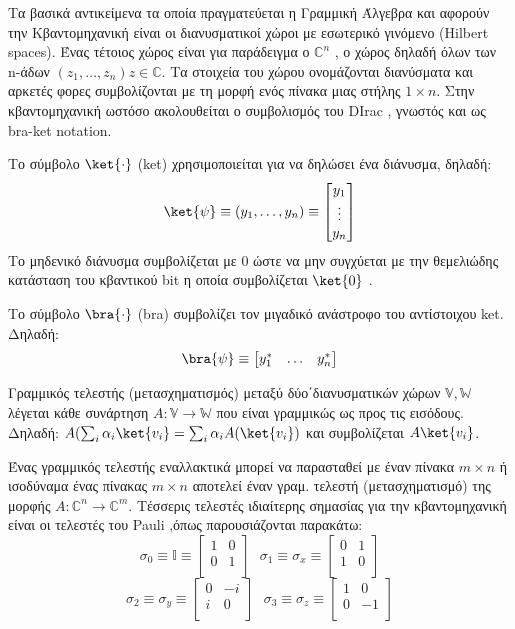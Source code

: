 


Τα βασικά αντικείμενα τα οποία πραγματεύεται η Γραμμική Άλγεβρα και αφορούν την Κβαντομηχανική είναι οι διανυσματικοί χώροι με εσωτερικό γινόμενο (Hilbert spaces). Ένας τέτοιος χώρος είναι για παράδειγμα ο $\mathbb{C}^n$ , ο χώρος δηλαδή όλων των n-άδων $(z_1,\ldots,z_n) z \in \mathbb{C}$. Τα στοιχεία του χώρου ονομάζονται διανύσματα και αρκετές φορες συμβολίζονται με τη μορφή ενός πίνακα μιας στήλης $1 \times n$. Στην κβαντομηχανική ωστόσο ακολουθείται ο συμβολισμός του DIrac , γνωστός και ως bra-ket notation.

Το σύμβολο $\ket{\cdot}$ (ket) χρησιμοποιείται για να δηλώσει ένα διάνυσμα, δηλαδή: \[\ket{\psi} \equiv  (y_1,\ldots,y_n) \equiv  \begin{bmatrix}y_1\\\vdots\\y_n\end{bmatrix}\] Το μηδενικό διάνυσμα συμβολίζεται με $0$ ώστε να μην συγχύεται με την θεμελιώδης κατάσταση του κβαντικού bit η οποία συμβολίζεται $\ket{0}$ .

Το σύμβολο $\bra{\cdot}$ (bra) συμβολίζει τον μιγαδικό ανάστροφο του αντίστοιχου ket. Δηλαδή: \[\bra{\psi} \equiv  \begin{bmatrix}y_1^{*}&\ldots&y_n^{*}\end{bmatrix}\]

Γραμμικός τελεστής (μετασχηματισμός) μεταξύ δύο΄διανυσματικών χώρων $\mathbb{V},\mathbb{W}$ λέγεται κάθε συνάρτηση $A : \mathbb{V} \rightarrow \mathbb{W}$ που είναι γραμμικώς ως προς τις εισόδους.
Δηλαδή: $ A(\sum_i\alpha_i\ket{v_i} = \sum_i\alpha_iA(\ket{v_i}) $ και συμβολίζεται $A\ket{v_i}$.

Ένας γραμμικός τελεστής εναλλακτικά μπορεί να παρασταθεί με έναν πίνακα $m \times n$ ή ισοδύναμα ένας πίνακας $m \times n$ αποτελεί έναν γραμ. τελεστή (μετασχηματισμό) της μορφής $A : \mathbb{C}^n \rightarrow \mathbb{C}^m$. Τέσσερις τελεστές ιδιαίτερης σημασίας για την κβαντομηχανική είναι οι τελεστές του Pauli ,όπως παρουσιάζονται παρακάτω:
\[
\sigma_0 \equiv  \mathbb{I} \equiv 
\begin{bmatrix}
1&0\\
0&1\\
\end{bmatrix}  
\ \ \ \sigma_1 \equiv  \sigma_x \equiv 
\begin{bmatrix}
0&1\\
1&0\\
\end{bmatrix}\]\[
\sigma_2 \equiv  \sigma_y \equiv 
\begin{bmatrix}
0&-i\\
i&0\\
\end{bmatrix}  
\ \ \ \sigma_3 \equiv  \sigma_z \equiv 
\begin{bmatrix}
1&0\\
0&-1\\
\end{bmatrix}
\]

